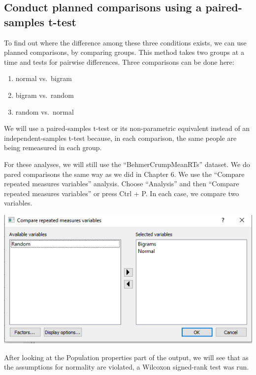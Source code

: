 \documentclass[
]{book}
\begin{document}
\hypertarget{conduct-planned-comparisons-using-a-paired-samples-t-test-1}{%
\subsection{Conduct planned comparisons using a paired-samples t-test}\label{conduct-planned-comparisons-using-a-paired-samples-t-test-1}}

To find out where the difference among these three conditions exists, we can use planned comparisons, by comparing groups. This method takes two groups at a time and tests for pairwise differences. Three comparisons can be done here:

\begin{enumerate}
\def\labelenumi{\arabic{enumi}.}
\item
  normal vs.~bigram
\item
  bigram vs.~random
\item
  random vs.~normal
\end{enumerate}

We will use a paired-samples t-test or its non-parametric equivalent instead of an independent-samples t-test because, in each comparison, the same people are being remeasured in each group.

For these analyses, we will still use the ``BehmerCrumpMeanRTs'' dataset. We do pared comparisons the same way as we did in Chapter 6. We use the ``Compare repeated measures variables'' analysis. Choose ``Analysis'' and then ``Compare repeated measures variables'' or press Ctrl + P. In each case, we compare two variables.

\includegraphics{img/ch9/9.5CRMVAG_window.png}

After looking at the Population properties part of the output, we will see that as the assumptions for normality are violated, a Wilcoxon signed-rank test was run.
\end{document}
